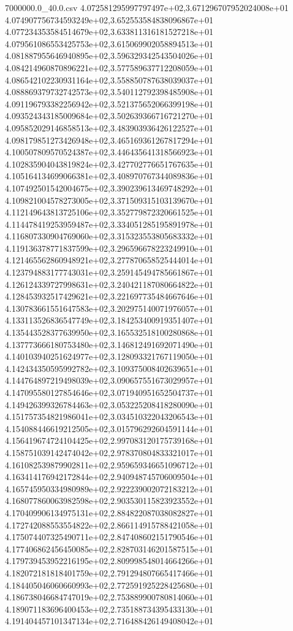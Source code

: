 \begin{filecontents*}{7000000.0_40.0.csv}
4.072581295997797497e+02,3.671296707952024008e+01
4.074907756734593249e+02,3.652553584838096867e+01
4.077234353584514679e+02,3.633811316181527218e+01
4.079561086553425753e+02,3.615069902058894513e+01
4.081887955646940895e+02,3.596329342543504026e+01
4.084214960870896221e+02,3.577589637712208059e+01
4.086542102230931164e+02,3.558850787638039037e+01
4.088869379732742573e+02,3.540112792398485908e+01
4.091196793382256942e+02,3.521375652066399198e+01
4.093524343185009684e+02,3.502639366716721270e+01
4.095852029146858513e+02,3.483903936426122527e+01
4.098179851273426948e+02,3.465169361267817294e+01
4.100507809570524387e+02,3.446435641318566923e+01
4.102835904043819824e+02,3.427702776651767635e+01
4.105164134699066381e+02,3.408970767344089836e+01
4.107492501542004675e+02,3.390239613469748292e+01
4.109821004578273005e+02,3.371509315103139670e+01
4.112149643813725106e+02,3.352779872320661525e+01
4.114478419253959487e+02,3.334051285195891978e+01
4.116807330904769060e+02,3.315323553805683332e+01
4.119136378771837599e+02,3.296596678223249910e+01
4.121465562860948921e+02,3.277870658525444014e+01
4.123794883177743031e+02,3.259145494785661867e+01
4.126124339727998631e+02,3.240421187080664822e+01
4.128453932517429621e+02,3.221697735484667646e+01
4.130783661551647583e+02,3.202975140071976057e+01
4.133113526836547749e+02,3.184253400919351407e+01
4.135443528377639950e+02,3.165532518100280868e+01
4.137773666180753480e+02,3.146812491692071490e+01
4.140103940251624977e+02,3.128093321767119050e+01
4.142434350595992782e+02,3.109375008402639651e+01
4.144764897219498039e+02,3.090657551673029957e+01
4.147095580127854646e+02,3.071940951652504737e+01
4.149426399326784463e+02,3.053225208418280090e+01
4.151757354821986041e+02,3.034510322043206543e+01
4.154088446619212505e+02,3.015796292604591144e+01
4.156419674724104425e+02,2.997083120175739168e+01
4.158751039142474042e+02,2.978370804833321017e+01
4.161082539879902811e+02,2.959659346651096712e+01
4.163414176942172844e+02,2.940948745706009504e+01
4.165745950334980989e+02,2.922239002072183212e+01
4.168077860063982598e+02,2.903530115823923552e+01
4.170409906134975131e+02,2.884822087038082827e+01
4.172742088553554822e+02,2.866114915788421058e+01
4.175074407325490711e+02,2.847408602151790546e+01
4.177406862456450085e+02,2.828703146201587515e+01
4.179739453952216195e+02,2.809998548014664266e+01
4.182072181818401759e+02,2.791294807665417466e+01
4.184405046060660993e+02,2.772591925228425680e+01
4.186738046684747019e+02,2.753889900780814060e+01
4.189071183696400453e+02,2.735188734395433130e+01
4.191404457101347134e+02,2.716488426149408042e+01

\end{filecontents*}
